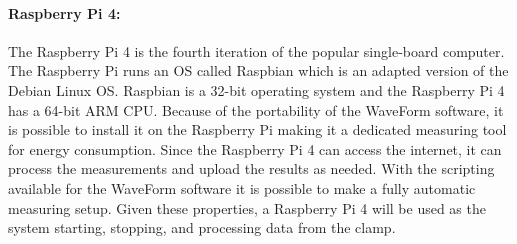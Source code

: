 \paragraph*{Raspberry Pi 4:}
The Raspberry Pi 4\cite{RaspberryPi4} is the fourth iteration of the popular single-board computer. The Raspberry Pi runs an OS called Raspbian which is an adapted version of the Debian Linux OS. Raspbian is a 32-bit operating system and the Raspberry Pi 4 has a 64-bit ARM CPU.\cite{RaspberryPi4} Because of the portability of the WaveForm software, it is possible to install it on the Raspberry Pi making it a dedicated measuring tool for energy consumption. Since the Raspberry Pi 4 can access the internet, it can process the measurements and upload the results as needed. With the scripting available for the WaveForm software it is possible to make a fully automatic measuring setup. Given these properties, a Raspberry Pi 4 will be used as the system starting, stopping, and processing data from the clamp.